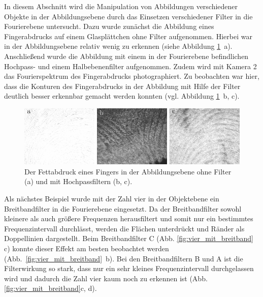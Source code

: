 In diesem Abschnitt wird die Manipulation von Abbildungen verschiedener Objekte in der Abbildungsebene durch das Einsetzen verschiedener Filter in die Fourierebene untersucht. Dazu wurde zunächst die Abbildung eines Fingerabdrucks auf einem Glasplättchen ohne Filter aufgenommen. Hierbei war in der Abbildungsebene relativ wenig zu erkennen (siehe Abbildung \ref{fig:example20_Hochpass}~a). Anschließend wurde die Abbildung mit einem in der Fourierebene befindlichen Hochpass- und einem Halbebenenfilter aufgenommen. Zudem wird mit Kamera 2 das Fourierspektrum des Fingerabdrucks photographiert. Zu beobachten war hier, dass die Konturen des Fingerabdrucks in der Abbildung mit Hilfe der Filter deutlich besser erkennbar gemacht werden konnten (vgl. Abbildung \ref{fig:example20_Hochpass}~b, c).\\

\begin{figure}[h]
	\centering
	\includegraphics{images/ergebniss_Fingerab/abb.pdf}
	\caption{
		Der Fettabdruck eines Fingers in der Abbildungsebene ohne Filter (a) und mit Hochpassfiltern (b, c).
	}
	\label{fig:example20_Hochpass}
\end{figure}

Als nächstes Beispiel wurde mit der Zahl vier in der Objektebene ein Breitbandfilter in die Fourierebene eingesetzt. Da der Breitbandfilter sowohl kleinere als auch größere Frequenzen herausfiltert und somit nur ein bestimmtes Frequenzintervall durchlässt, werden die Flächen unterdrückt und Ränder als Doppellinien dargestellt. Beim Breitbandfilter C (Abb. \ref{fig:vier_mit_breitband}
c) konnte dieser Effekt am besten beobachtet werden (Abb.~\ref{fig:vier_mit_breitband}~b). Bei den Breitbandfiltern B und A ist die Filterwirkung so stark, dass nur
ein sehr kleines Frequenzintervall durchgelassen wird und dadurch die Zahl vier kaum noch zu erkennen ist (Abb. \ref{fig:vier_mit_breitband}c, d).

